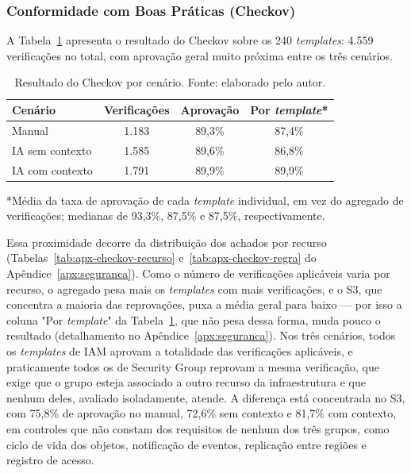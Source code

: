 \subsubsection{Conformidade com Boas Práticas (Checkov)}

A Tabela~\ref{tab:checkov} apresenta o resultado do Checkov sobre os 240 \textit{templates}: 4.559 verificações no total, com aprovação geral muito próxima entre os três cenários.

\begin{table}[H]
\centering
\caption{Resultado do Checkov por cenário. Fonte: elaborado pelo autor.}
\label{tab:checkov}
\small
\begin{tabular}{l|c|c|c}
\hline
\textbf{Cenário} & \textbf{Verificações} & \textbf{Aprovação} & \textbf{Por \textit{template}*} \\
\hline
Manual & 1.183 & 89,3\% & 87,4\% \\
IA sem contexto & 1.585 & 89,6\% & 86,8\% \\
IA com contexto & 1.791 & 89,9\% & 89,9\% \\
\hline
\end{tabular}
\vspace{2pt}
\footnotesize{*Média da taxa de aprovação de cada \textit{template} individual, em vez do agregado de verificações; medianas de 93,3\%, 87,5\% e 87,5\%, respectivamente.}
\end{table}

Essa proximidade decorre da distribuição dos achados por recurso (Tabelas~\ref{tab:apx-checkov-recurso} e~\ref{tab:apx-checkov-regra} do Apêndice~\ref{apx:seguranca}). Como o número de verificações aplicáveis varia por recurso, o agregado pesa mais os \textit{templates} com mais verificações, e o S3, que concentra a maioria das reprovações, puxa a média geral para baixo — por isso a coluna "Por \textit{template}" da Tabela~\ref{tab:checkov}, que não pesa dessa forma, muda pouco o resultado (detalhamento no Apêndice~\ref{apx:seguranca}). Nos três cenários, todos os \textit{templates} de IAM aprovam a totalidade das verificações aplicáveis, e praticamente todos os de Security Group reprovam a mesma verificação, que exige que o grupo esteja associado a outro recurso da infraestrutura e que nenhum deles, avaliado isoladamente, atende. A diferença está concentrada no S3, com 75,8\% de aprovação no manual, 72,6\% sem contexto e 81,7\% com contexto, em controles que não constam dos requisitos de nenhum dos três grupos, como ciclo de vida dos objetos, notificação de eventos, replicação entre regiões e registro de acesso.

